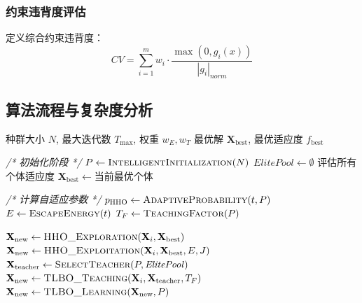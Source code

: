 \documentclass[conference]{IEEEtran}
\begin{document}
\subsubsection{约束违背度评估}
定义综合约束违背度：
\begin{equation}
CV = \sum_{i=1}^{m} w_i \cdot \frac{\max(0, g_i(x))}{|g_i|_{norm}}
\end{equation}
\subsection{算法流程与复杂度分析}
\begin{algorithm}[!h]            %
  \caption{TLBO–HHO 双阶段集成算法}
  \label{alg:tlbo_hho}
  \begin{algorithmic}[1]
    \REQUIRE 种群大小 $N$, 最大迭代数 $T_{\max}$, 权重 $w_E, w_T$
    \ENSURE 最优解 $\mathbf{X}_{\text{best}}$, 最优适应度 $f_{\text{best}}$

    \STATE \textit{/* 初始化阶段 */}
    \STATE $P \leftarrow \textsc{IntelligentInitialization}(N)$
    \STATE $\mathit{ElitePool} \leftarrow \emptyset$
    \STATE 评估所有个体适应度
    \STATE $\mathbf{X}_{\text{best}} \leftarrow \text{当前最优个体}$

        \STATE \textit{/* 计算自适应参数 */}
        \STATE $p_{\mathrm{HHO}} \leftarrow \textsc{AdaptiveProbability}(t, P)$
        \STATE $E \leftarrow \textsc{EscapeEnergy}(t)$
        \STATE $T_F \leftarrow \textsc{TeachingFactor}(P)$

                    \STATE $\mathbf{X}_{\text{new}} \leftarrow
                           \textsc{HHO\_Exploration}(\mathbf{X}_i,\mathbf{X}_{\text{best}})$
                \ELSE
                    \STATE $\mathbf{X}_{\text{new}} \leftarrow
                           \textsc{HHO\_Exploitation}(\mathbf{X}_i,\mathbf{X}_{\text{best}},E,J)$
                \ENDIF
            \ELSE                                        %
                \STATE $\mathbf{X}_{\text{teacher}} \leftarrow
                       \textsc{SelectTeacher}(P,\mathit{ElitePool})$
                \STATE $\mathbf{X}_{\text{new}} \leftarrow
                       \textsc{TLBO\_Teaching}(\mathbf{X}_i,\mathbf{X}_{\text{teacher}},T_F)$
                \STATE $\mathbf{X}_{\text{new}} \leftarrow
                       \textsc{TLBO\_Learning}(\mathbf{X}_{\text{new}},P)$
            \ENDIF


\end{algorithmic}
\end{algorithm}
\end{document}
